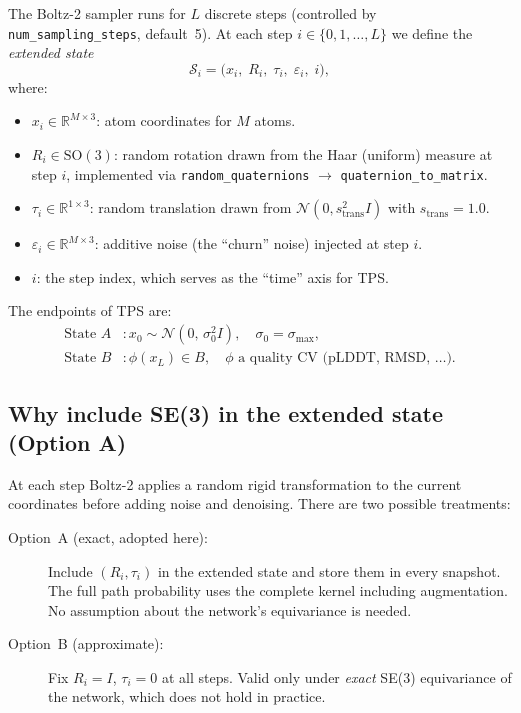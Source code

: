 \documentclass[11pt,a4paper]{article}
\newcommand{\R}{\mathbb{R}}
\newcommand{\N}{\mathcal{N}}
\begin{document}
The Boltz-2 sampler runs for $L$ discrete steps
(controlled by \texttt{num\_sampling\_steps}, default~5).  At each step
$i \in \{0,1,\ldots,L\}$ we define the \emph{extended state}
\begin{equation}
  \mathcal{S}_i = \bigl(x_i,\; R_i,\; \tau_i,\; \varepsilon_i,\; i\bigr),
\end{equation}
where:
\begin{itemize}
  \item $x_i \in \R^{M \times 3}$: atom coordinates for $M$ atoms.
  \item $R_i \in \mathrm{SO}(3)$: random rotation drawn from the Haar
        (uniform) measure at step $i$, implemented via
        \texttt{random\_quaternions} $\to$ \texttt{quaternion\_to\_matrix}.
  \item $\tau_i \in \R^{1 \times 3}$: random translation drawn from
        $\N(0, s_{\mathrm{trans}}^2 I)$ with $s_{\mathrm{trans}} = 1.0$.
  \item $\varepsilon_i \in \R^{M \times 3}$: additive noise (the
        ``churn'' noise) injected at step $i$.
  \item $i$: the step index, which serves as the ``time'' axis for TPS.
\end{itemize}
The endpoints of TPS are:
\begin{align}
  \text{State } A &: x_0 \sim \N(0,\, \sigma_0^2 I),\quad
                     \sigma_0 = \sigma_{\max},\\
  \text{State } B &: \phi(x_L) \in B,\quad
                     \phi \text{ a quality CV (pLDDT, RMSD, \ldots)}.
\end{align}

\subsection{Why include SE(3) in the extended state (Option A)}
\label{sec:optionA}

At each step Boltz-2 applies a random rigid transformation to the
current coordinates before adding noise and denoising.  There are two
possible treatments:

\begin{description}
  \item[Option~A (exact, adopted here):] Include $(R_i, \tau_i)$ in the
    extended state and store them in every snapshot.  The full path
    probability uses the complete kernel including augmentation.  No
    assumption about the network's equivariance is needed.

  \item[Option~B (approximate):] Fix $R_i = I$, $\tau_i = 0$ at all
    steps.  Valid only under \emph{exact} SE(3) equivariance of the
    network, which does not hold in practice.
\end{description}
\end{document}
